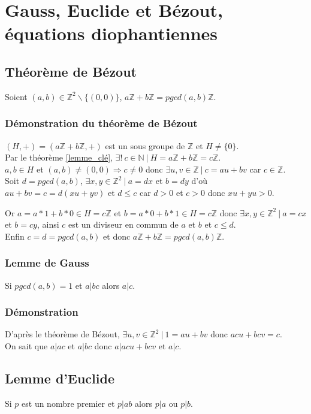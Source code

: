 \documentclass[a4paper,10pt]{book} %
\newcommand{\N}{\mathbb{N}}
\newcommand{\Z}{\mathbb{Z}}
\newcommand{\tq}{~|~}
\begin{document}
\section{Gauss, Euclide et Bézout, équations diophantiennes}
\subsection{Théorème de Bézout}
Soient $(a,b)\in \Z^2\backslash\{(0,0)\}$, $a\Z+b\Z=pgcd(a,b)\Z$.

\subsubsection{Démonstration du théorème de Bézout}
$(H,+)=(a\Z+b\Z,+)$ est un sous groupe de $\Z$ et $H\neq \{0\}$.\\

Par le théorème \ref{lemme_clé}, $\exists!~c\in \N\tq H=a\Z+b\Z=c\Z$.\\
$a,b\in H$ et $(a,b)\neq (0,0) \Rightarrow c\neq 0$ donc $\exists u,v\in \Z\tq c=au+bv$ car $c\in \Z$.\\

Soit $d=pgcd(a,b)$, $\exists x,y\in \Z^2\tq a=dx$ et $b=dy$ d'où $au+bv=c=d(xu+yv)$ et $d\leq c$ car $d>0$ et $c>0$ donc $xu+yu>0$.

Or $a=a*1+b*0\in H=c\Z$ et $b=a*0+b*1\in H=c\Z$ donc $\exists x,y\in \Z^2\tq a=cx$ et $b=cy$, ainsi $c$ est un diviseur en commun de $a$ et $b$ et $c\leq d$.\\

Enfin $c=d=pgcd(a,b)$ et donc $a\Z+b\Z=pgcd(a,b)\Z$.

\subsubsection{Lemme de Gauss}
Si $pgcd(a,b)=1$ et $a|bc$ alors $a|c$.

\subsubsection{Démonstration}
D'après le théorème de Bézout, $\exists u,v\in \Z^2\tq 1=au+bv$ donc $acu+bcv=c$.\\
On sait que $a|ac$ et $a|bc$ donc $a|acu+bcv$ et $a|c$.

\newpage

\subsection{Lemme d'Euclide}
Si $p$ est un nombre premier et $p|ab$ alors $p|a$ ou $p|b$.
\end{document}
